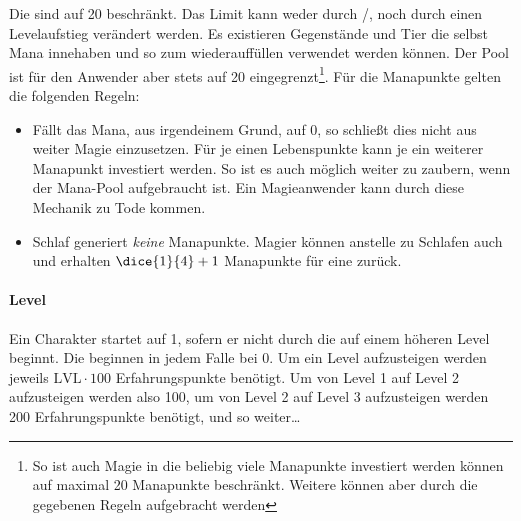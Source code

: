 Die  sind auf 20 beschränkt. Das Limit kann weder durch \SP/\GP{}, noch durch einen Levelaufstieg verändert werden.
Es existieren Gegenstände und Tier die selbst Mana innehaben und so zum wiederauffüllen verwendet werden können. Der Pool ist für den Anwender aber stets auf 20 eingegrenzt\footnote{So ist auch Magie in die beliebig viele Manapunkte investiert werden können auf maximal 20 Manapunkte beschränkt. Weitere  können aber durch die gegebenen Regeln aufgebracht werden}. Für die Manapunkte gelten die folgenden Regeln:
\begin{itemize}
    \item Fällt das Mana, aus irgendeinem Grund, auf 0, so schließt dies nicht aus weiter Magie einzusetzen. Für je einen Lebenspunkte kann je ein weiterer Manapunkt investiert werden. So ist es auch möglich weiter zu zaubern, wenn der Mana-Pool aufgebraucht ist. Ein Magieanwender kann durch diese Mechanik zu Tode kommen.
    \item Schlaf generiert \emph{keine} Manapunkte.
    Magier können anstelle zu Schlafen auch  und erhalten \(\dice{1}{4} + 1\) Manapunkte für eine  zurück.
\end{itemize}

\paragraph{Level}
\begin{wrapfigure}[4]{r}{0.375\linewidth}
    \vspace*{-0.75\topsep}\centering{}
\end{wrapfigure}
Ein Charakter startet auf  1, sofern er nicht durch die  auf einem höheren Level beginnt.
Die  beginnen in jedem Falle bei \(0\).
Um ein Level aufzusteigen werden jeweils \(\mathrm{LVL} \cdot 100\) Erfahrungspunkte benötigt.
Um von Level 1 auf Level 2 aufzusteigen werden also 100, um von Level 2 auf Level 3 aufzusteigen werden 200 Erfahrungspunkte benötigt, und so weiter\ldots

